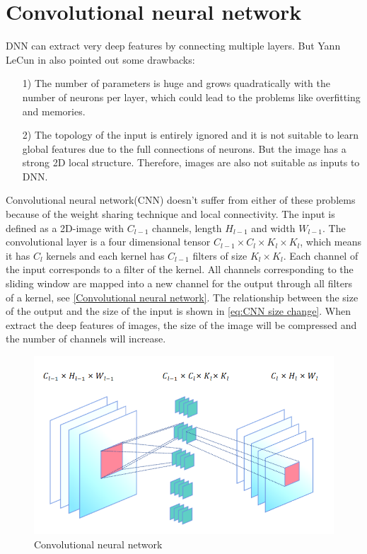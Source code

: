 \section{Convolutional neural network}
  DNN can extract very deep features by connecting multiple layers. But Yann LeCun in \cite{LeCun1995-LECCNF} also pointed out some drawbacks:
  \begin{itemize}
    \item [1)] The number of parameters is huge and grows quadratically with the number of neurons per layer, which could lead to the problems like overfitting and memories.
    \item [2)] The topology of the input is entirely ignored and it is not suitable to learn global features due to the full connections of neurons. But the image 
    has a strong 2D local structure. Therefore, images are also not suitable as inputs to DNN.
  \end{itemize}
  Convolutional neural network(CNN) doesn't suffer from either of these problems because of the  weight sharing technique and local connectivity. 
  The input is defined as a 2D-image with $C_{l-1}$ channels, length $H_{l-1}$ and width $W_{l-1}$. The convolutional layer is a four dimensional tensor $C_{l-1} \times C_{l} \times K_{l} \times K_{l}$,
  which means it has $C_{l}$ kernels and each kernel has $C_{l-1}$ filters of size $K_{l} \times K_{l}$. Each channel of the input corresponds to a filter of the kernel. All channels corresponding to 
  the sliding window are mapped into a new channel for the output through all filters of a kernel, see \autoref{Convolutional neural network}. The relationship between the size of the output and 
  the size of the input is shown in \autoref{eq:CNN size change}. When extract the deep features of images, the size of the image will be compressed and the number of channels will increase.
  \begin{figure}
    \centering
    \includegraphics[width=0.9\linewidth]{example_images/CNN}
    \caption{Convolutional neural network}
    \label{Convolutional neural network}
  \end{figure}
